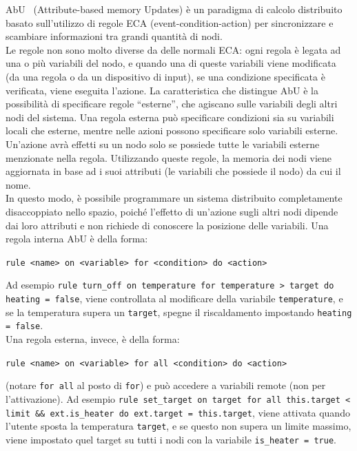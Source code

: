 \documentclass[target=bach]{thud}
\begin{document}
AbU~\cite{MP-ICTAC-2021} (Attribute-based memory Updates) è un paradigma di calcolo distribuito basato sull'utilizzo di regole ECA (event-condition-action) per sincronizzare e scambiare informazioni tra grandi quantità di nodi.\\
Le regole non sono molto diverse da delle normali ECA: ogni regola è legata ad una o più variabili del nodo, e quando una di queste variabili viene modificata (da una regola o da un dispositivo di input), se una condizione specificata è verificata, viene eseguita l'azione.
La caratteristica che distingue AbU è la possibilità di specificare regole ``esterne'', che agiscano sulle variabili degli altri nodi del sistema. Una regola esterna può specificare condizioni sia su variabili locali che esterne, mentre nelle azioni possono specificare solo variabili esterne. Un'azione avrà effetti su un nodo solo se possiede tutte le variabili esterne menzionate nella regola.
Utilizzando queste regole, la memoria dei nodi viene aggiornata in base ad i suoi attributi (le variabili che possiede il nodo) da cui il nome.\\
In questo modo, è possibile programmare un sistema distribuito completamente disaccoppiato nello spazio, poiché l'effetto di un'azione sugli altri nodi dipende dai loro attributi e non richiede di conoscere la posizione delle variabili.
Una regola interna AbU è della forma:
\begin{center}
    \lstinline{rule <name> on <variable> for <condition> do <action>}
\end{center}
Ad esempio \lstinline{rule turn_off on temperature for temperature > target do heating = false}, viene controllata al modificare della variabile \lstinline{temperature}, e se la temperatura supera un \lstinline{target}, spegne il riscaldamento impostando \lstinline{heating = false}.\\
Una regola esterna, invece, è della forma:
\begin{center}
    \lstinline{rule <name> on <variable> for all <condition> do <action>}
\end{center}
(notare \lstinline{for all} al posto di \lstinline{for}) e può accedere a variabili remote (non per l'attivazione). Ad esempio \lstinline{rule set_target on target for all this.target < limit && ext.is_heater do ext.target = this.target}, viene attivata quando l'utente sposta la temperatura \lstinline{target}, e se questo non supera un limite massimo, viene impostato quel target su tutti i nodi con la variabile \lstinline{is_heater = true}.
\end{document}
